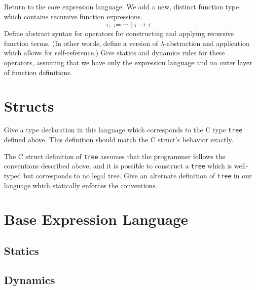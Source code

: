 \documentclass{article}
\begin{document}
\begin{task} \label{task:lambda} Return to the core expression
  language. We add a new, distinct function type which contains
  recursive function expressions.
  \[
    \tau ::= \cdots \mid \tau \to \tau
  \]
  Define abstract syntax for operators for constructing and applying
  recursive function terms. (In other words, define a version of
  $\lambda$-abstraction and application which allows for
  self-reference.) Give statics and dynamics rules for these
  operators, assuming that we have only the expression language and no
  outer layer of function definitions.
\end{task}
\begin{sol}
\end{sol}

\section{Structs}
\begin{task}
  Give a type declaration in this language which corresponds to the C type \verb|tree| defined above. This definition should match the C struct's behavior exactly.
\end{task}
\begin{sol}
\end{sol}

\begin{task}
  The C struct definition of \verb|tree| assumes that the programmer
  follows the conventions described above, and it is possible to
  construct a \verb|tree| which is well-typed but corresponds to no
  legal tree. Give an alternate definition of \verb|tree| in our
  language which statically enforces the conventions.
\end{task}
\begin{sol}
\end{sol}

\section{Base Expression Language} \label{app:exp}
\subsection{Statics}
\subsection{Dynamics}
\end{document}
